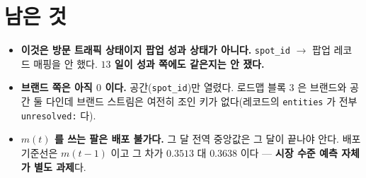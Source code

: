 \documentclass[11pt]{article}
\begin{document}
\section*{남은 것}

\begin{itemize}
\item \textbf{이것은 방문 트래픽 상태이지 팝업 성과 상태가 아니다.}
\texttt{spot\_id} $\to$ 팝업 레코드 매핑을 안 했다. \textbf{$13$ 일이
성과 쪽에도 같은지는 안 쟀다.}
\item \textbf{브랜드 쪽은 아직 $0$ 이다.} 공간(\texttt{spot\_id})만 열렸다.
로드맵 블록 $3$ 은 브랜드와 공간 둘 다인데 브랜드 스트림은 여전히 조인
키가 없다(레코드의 \texttt{entities} 가 전부 \texttt{unresolved:} 다).
\item \textbf{$m(t)$ 를 쓰는 팔은 배포 불가다.} 그 달 전역 중앙값은
그 달이 끝나야 안다. 배포 기준선은 $m(t{-}1)$ 이고 그 차가
$0.3513$ 대 $0.3638$ 이다 --- \textbf{시장 수준 예측 자체가 별도 과제}다.
\end{itemize}
\end{document}
